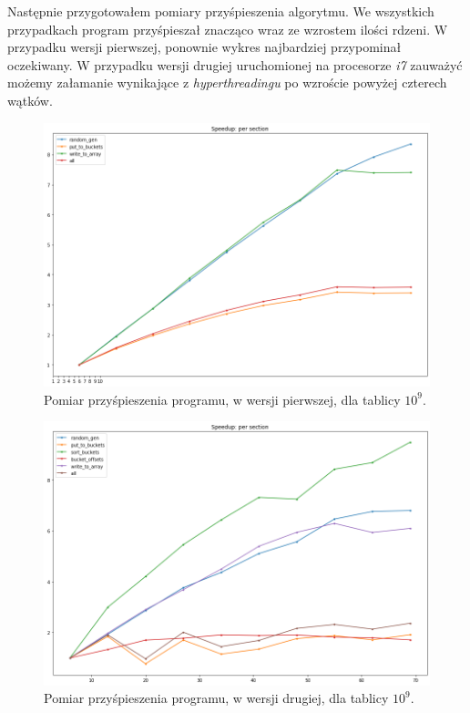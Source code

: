 \documentclass{article}
\begin{document}
        \newpage
        Następnie przygotowałem pomiary przyśpieszenia algorytmu. We wszystkich przypadkach program przyśpieszał znacząco wraz ze wzrostem ilości rdzeni. W przypadku wersji pierwszej, ponownie wykres najbardziej przypominał oczekiwany. W przypadku wersji drugiej uruchomionej na procesorze \textit{i7} zauważyć możemy załamanie wynikające z \textit{hyperthreadingu} po wzroście powyżej czterech wątków. 
        \begin{figure}[h!]
            \centering
            \includegraphics[width=17cm]{report2/images/Speedup/sam_speedup.png}        
            \caption{Pomiar przyśpieszenia programu, w wersji pierwszej, dla tablicy ${10^{9}}$. }
        \end{figure}
        
        \newpage
        \begin{figure}[h!]
            \centering
            \includegraphics[width=15cm]{report2/images/Speedup/speedup.png}        
            \caption{Pomiar przyśpieszenia programu, w wersji drugiej, dla tablicy ${10^{9}}$. }
        \end{figure}
        
\end{document}
